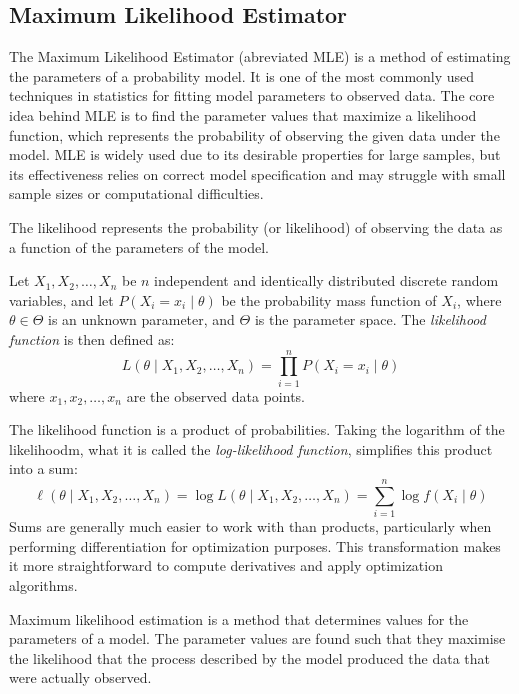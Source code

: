 \subsection{Maximum Likelihood Estimator}

The Maximum Likelihood Estimator (abreviated MLE) is a method of estimating the parameters of a probability model. It is one of the most commonly used techniques in statistics for fitting model parameters to observed data. The core idea behind MLE is to find the parameter values that maximize a likelihood function, which represents the probability of observing the given data under the model. MLE is widely used due to its desirable properties for large samples, but its effectiveness relies on correct model specification and may struggle with small sample sizes or computational difficulties.

The likelihood represents the probability (or likelihood) of observing the data as a function of the parameters of the model.

\begin{definition}
Let \( X_1, X_2, \dots, X_n \) be $n$ independent and identically distributed discrete random variables, and let \( P(X_i = x_i \mid \theta) \) be the probability mass function of \( X_i \), where \( \theta \in \Theta \) is an unknown parameter, and \( \Theta \) is the parameter space. The \emph{likelihood function} is then defined as:
\[
L(\theta \mid X_1, X_2, \dots, X_n) = \prod_{i=1}^{n} P(X_i = x_i \mid \theta)
\]
where \( x_1, x_2, \dots, x_n \) are the observed data points.
\end{definition}

The likelihood function is a product of probabilities. Taking the logarithm of the likelihoodm, what it is called the \emph{log-likelihood function}, simplifies this product into a sum:
\[
\ell(\theta \mid X_1, X_2, \dots, X_n) = \log L(\theta \mid X_1, X_2, \dots, X_n) = \sum_{i=1}^{n} \log f(X_i \mid \theta)
\]
Sums are generally much easier to work with than products, particularly when performing differentiation for optimization purposes. This transformation makes it more straightforward to compute derivatives and apply optimization algorithms.

Maximum likelihood estimation is a method that determines values for the parameters of a model. The parameter values are found such that they maximise the likelihood that the process described by the model produced the data that were actually observed.


